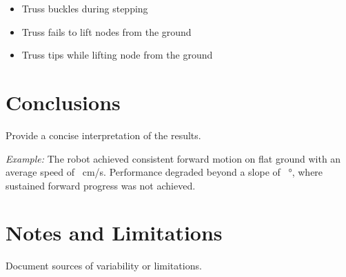 \documentclass[11pt]{article}
\begin{document}
\begin{itemize}[noitemsep]
    \item Truss buckles during stepping
    \item Truss fails to lift nodes from the ground
    \item Truss tips while lifting node from the ground
\end{itemize}

\section*{Conclusions}
Provide a concise interpretation of the results.

\textit{Example:} The robot achieved consistent forward motion on flat ground with an average speed of \underline{\hspace{ 1cm}}~cm/s. Performance degraded beyond a slope of \underline{\hspace{1 cm}}~\si{\degree}, where sustained forward progress was not achieved.

\section*{Notes and Limitations}
Document sources of variability or limitations.
\end{document}
